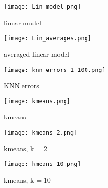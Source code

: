 \documentclass{article}
\begin{document}
\begin{figure}[h]
\centering
\texttt{[image: Lin\_model.png]}
\caption{linear model}
\end{figure}

\begin{figure}[h]
\centering
\texttt{[image: Lin\_averages.png]}
\caption{averaged linear model}
\end{figure}

\begin{figure}[h]
\centering
\texttt{[image: knn\_errors\_1\_100.png]}
\caption{KNN errors}
\end{figure}

\begin{figure}[h]
\centering
\texttt{[image: kmeans.png]}
\caption{kmeans}
\end{figure}

\begin{figure}[h]
\centering
\texttt{[image: kmeans\_2.png]}
\caption{kmeans, k = 2}
\end{figure}

\begin{figure}[h]
\centering
\texttt{[image: kmeans\_10.png]}
\caption{kmeans, k = 10}
\end{figure}
\end{document}
